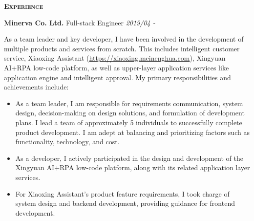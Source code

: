 \documentclass[a4paper]{article}
\newenvironment{changemargin}[2]{%
  \begin{list}{}{%
    \setlength{\topsep}{0pt}%
    \setlength{\leftmargin}{#1}%
    \setlength{\rightmargin}{#2}%
    \setlength{\listparindent}{\parindent}%
    \setlength{\itemindent}{\parindent}%
    \setlength{\parsep}{\parskip}%
  }%
  \item[]}{\end{list}
}
\newcommand{\lineover}{
	\begin{changemargin}{-0.05in}{-0.05in}
		\vspace*{-8pt}
		\hrulefill \\
		\vspace*{-2pt}
	\end{changemargin}
}
\newcommand{\header}[1]{
	\begin{changemargin}{-0.5in}{-0.5in}
		\scshape{\textbf{#1}}\\
	\end{changemargin}
}
\newenvironment{body} {
	\vspace*{-16pt}
	\begin{changemargin}{-0.5in}{-0.5in}
  }
	{\end{changemargin}
}
\begin{document}
\header{Experience}
\begin{body}
	\vspace{14pt}
	\textbf{Minerva Co. Ltd.} \hfill Full-stack Engineer \emph{2019/04 - } \\
	\smallskip
	\begin{justify}
	As a team leader and key developer, I have been involved in the development of multiple products and services from scratch. This includes intelligent customer service, Xiaoxing Assistant (\url{https://xiaoxing.meinenghua.com}), Xingyuan AI+RPA low-code platform, as well as upper-layer application services like application engine and intelligent approval. My primary responsibilities and achievements include:\\
	\end{justify}
	\vspace*{-16pt}
	\begin{itemize} \itemsep -0pt  %
		\item As a team leader, I am responsible for requirements communication, system design, decision-making on design solutions, and formulation of development plans. I lead a team of approximately 5 individuals to successfully complete product development. I am adept at balancing and prioritizing factors such as functionality, technology, and cost.\\
	\end{itemize}
	\vspace*{-6pt}
	\begin{itemize} \itemsep -0pt  %
		\item As a developer, I actively participated in the design and development of the Xingyuan AI+RPA low-code platform, along with its related application layer services.\\
	\end{itemize}
	\vspace*{-6pt}
	\begin{itemize} \itemsep -0pt  %
		\item For Xiaoxing Assistant's product feature requirements, I took charge of system design and backend development, providing guidance for frontend development.\\
	\end{itemize}

\end{body}
\end{document}
